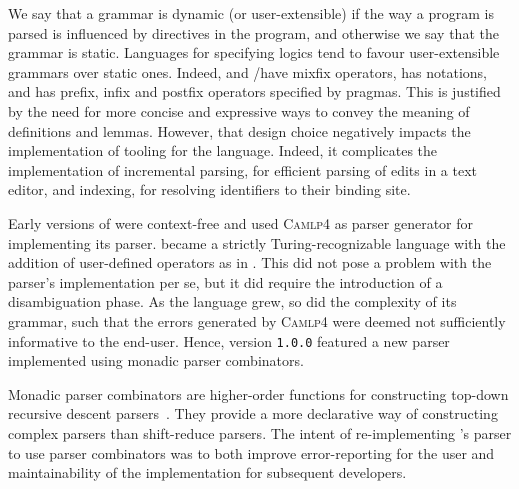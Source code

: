 
We say that a grammar is dynamic (or user-extensible) if the way a program is parsed is influenced by directives in the program, and otherwise we say that the grammar is static.
Languages for specifying logics tend to favour user-extensible grammars over static ones.
Indeed, \Agda and \Isabelle/\HOL have mixfix operators, \Coq has notations, and \Beluga has prefix, infix and postfix operators specified by pragmas.
This is justified by the need for more concise and expressive ways to convey the meaning of definitions and lemmas.
However, that design choice negatively impacts the implementation of tooling for the language.
Indeed, it complicates the implementation of incremental parsing, for efficient parsing of edits in a text editor, and indexing, for resolving identifiers to their binding site.

Early versions of \Beluga were context-free and used \textsc{Camlp4} as parser generator for implementing its parser.
\Beluga became a strictly Turing-recognizable language with the addition of user-defined operators as in \Twelf.
This did not pose a problem with the parser's implementation per se, but it did require the introduction of a disambiguation phase.
As the \Beluga language grew, so did the complexity of its grammar, such that the errors generated by \textsc{Camlp4} were deemed not sufficiently informative to the end-user.
Hence, \Beluga version \texttt{1.0.0} featured a new parser implemented using monadic parser combinators.


Monadic parser combinators are higher-order functions for constructing top-down recursive descent parsers~\cite{Burge1975-BURRPT, hutton1996monadic, leijen2001parsec, generalparsercombs}.
They provide a more declarative way of constructing complex parsers than shift-reduce parsers.
The intent of re-implementing \Beluga's parser to use parser combinators was to both improve error-reporting for the user and maintainability of the implementation for subsequent developers.


